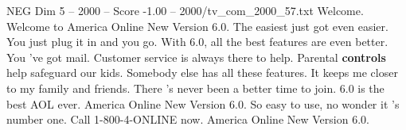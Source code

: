 \begin{textsample}{NEG Dim 5 – 2000 – Score -1.00 – 2000/tv\_com\_2000\_57.txt}  \label{ex:f5_neg_036}
Welcome.
Welcome to America Online New Version 6.0.
The easiest just got even easier.
You just plug it in and you go.
With 6.0, all the best features are even better.
You 've got mail.
Customer service is always there to help.
Parental \textbf{controls} help safeguard our kids.
Somebody else has all these features.
It keeps me closer to my family and friends.
There 's never been a better time to join. 6.0 is the best AOL ever.
America Online New Version 6.0.
So easy to use, no wonder it 's number one.
Call 1-800-4-ONLINE now.
America Online New Version 6.0.

\end{textsample}
